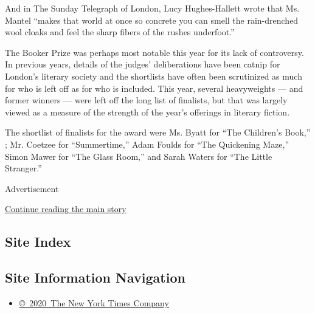And in The Sunday Telegraph of London, Lucy Hughes-Hallett wrote that
Ms. Mantel ``makes that world at once so concrete you can smell the
rain-drenched wool cloaks and feel the sharp fibers of the rushes
underfoot.''

The Booker Prize was perhaps most notable this year for its lack of
controversy. In previous years, details of the judges' deliberations
have been catnip for London's literary society and the shortlists have
often been scrutinized as much for who is left off as for who is
included. This year, several heavyweights --- and former winners ---
were left off the long list of finalists, but that was largely viewed as
a measure of the strength of the year's offerings in literary fiction.

The shortlist of finalists for the award were Ms. Byatt for ``The
Children's Book,'' ; Mr. Coetzee for ``Summertime,'' Adam Foulds for
``The Quickening Maze,'' Simon Mawer for ``The Glass Room,'' and Sarah
Waters for ``The Little Stranger.''

Advertisement

\protect\hyperlink{after-bottom}{Continue reading the main story}

\hypertarget{site-index}{%
\subsection{Site Index}\label{site-index}}

\hypertarget{site-information-navigation}{%
\subsection{Site Information
Navigation}\label{site-information-navigation}}

\begin{itemize}
\tightlist
\item
  \href{https://help.nytimes.com/hc/en-us/articles/115014792127-Copyright-notice}{©~2020~The
  New York Times Company}
\end{itemize}

